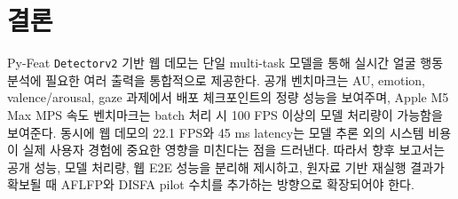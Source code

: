 \documentclass[11pt]{article}
\newcommand{\detector}{\texttt{Detectorv2}}
\begin{document}
\section{결론}

Py-Feat \detector{} 기반 웹 데모는 단일 multi-task 모델을 통해 실시간 얼굴 행동 분석에 필요한 여러 출력을 통합적으로 제공한다. 공개 벤치마크는 AU, emotion, valence/arousal, gaze 과제에서 배포 체크포인트의 정량 성능을 보여주며, Apple M5 Max MPS 속도 벤치마크는 batch 처리 시 100 FPS 이상의 모델 처리량이 가능함을 보여준다. 동시에 웹 데모의 22.1 FPS와 45 ms latency는 모델 추론 외의 시스템 비용이 실제 사용자 경험에 중요한 영향을 미친다는 점을 드러낸다. 따라서 향후 보고서는 공개 성능, 모델 처리량, 웹 E2E 성능을 분리해 제시하고, 원자료 기반 재실행 결과가 확보될 때 AFLFP와 DISFA pilot 수치를 추가하는 방향으로 확장되어야 한다.



\end{document}
